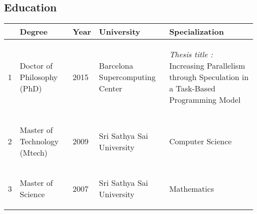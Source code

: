 \documentclass[margin]{res}
\begin{document}
\begin{resume}
\section{Education}

    \begin{center}
        \begin{tabular} {|p{1cm} |p{2cm}|p{1cm}|p{3cm}|p{4cm}|  }
            \hline
              & Degree & Year & University & Specialization \\ \hline
            \hline
%
            \begin{center} 1 \end{center} & \begin{center} Doctor of Philosophy (PhD) \end{center} & \begin{center} 2015 \end{center} & \begin{center} Barcelona Supercomputing Center \end{center} & \begin{center} {\it Thesis title :} Increasing Parallelism through Speculation in a Task-Based Programming Model \end{center} \\
            \hline
%
            \begin{center} 2 \end{center} & \begin{center} Master of Technology (Mtech) \end{center} & \begin{center} 2009 \end{center} & \begin{center} Sri Sathya Sai University \end{center} & \begin{center} Computer Science \end{center} \\
            \hline
%
            \begin{center} 3 \end{center} & \begin{center} Master of Science \end{center} & \begin{center} 2007 \end{center} & \begin{center} Sri Sathya Sai University \end{center} & \begin{center} Mathematics \end{center} \\

\end{tabular}
\end{center}
\end{resume}
\end{document}
